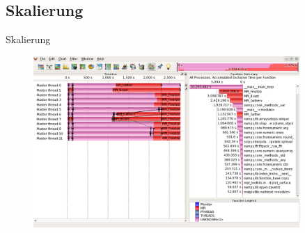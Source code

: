\subsection{Skalierung}
\begin{frame}{Skalierung}
	\begin{center}
		\begin{figure}[h]
			\includegraphics[width=0.9\textwidth]{img/Vampir_trace}
		\end{figure}
	\end{center}
\end{frame}
